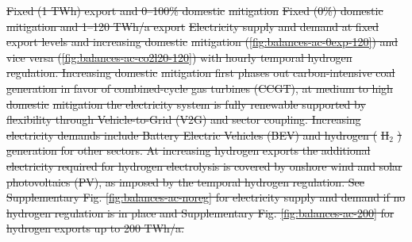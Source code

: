 \documentclass[5p,numafflabel]{elsarticle}
\newcommand{\co}{\ce{CO2}~}
\def\co{CO${}_2${\:}}
\providecommand{\DIFdeltex}[1]{{\protect\color{red}\sout{#1}}}                      %
\providecommand{\DIFdelFL}[1]{\DIFdel{#1}} %
\providecommand{\DIFdel}[1]{\texorpdfstring{\DIFdeltex{#1}}{}} %
\begin{document}
{%
\DIFdelFL{Fixed (1 TWh) export and 0--100\% domestic }%
\DIFdelFL{mitigation}}
{%
\DIFdelFL{Fixed (0\%) domestic }%
\DIFdelFL{mitigation and 1--120 TWh/a export}}
{%
\DIFdelFL{Electricity supply and demand at fixed export levels and increasing domestic }%
\DIFdelFL{mitigation (\ref{fig:balances-ac-0exp-120}) and vice versa (\ref{fig:balances-ac-co2l20-120}) with hourly temporal hydrogen regulation. Increasing domestic }%
\DIFdelFL{mitigation first phases out carbon-intensive coal generation in favor of combined-cycle gas turbines (CCGT), at medium to high domestic }%
\DIFdelFL{mitigation the electricity system is fully renewable supported by flexibility through Vehicle-to-Grid (V2G) and sector coupling. Increasing electricity demands include Battery Electric Vehicles (BEV) and hydrogen (}%
\DIFdelFL{H${}_2$}%
\DIFdelFL{) generation for other sectors.
    At increasing hydrogen exports the additional electricity required for hydrogen electrolysis is covered by onshore wind and solar photovoltaics (PV), as imposed by the temporal hydrogen regulation. 
    See Supplementary Fig. \ref{fig:balances-ac-noreg} for electricity supply and demand if no hydrogen regulation is in place and Supplementary Fig. \ref{fig:balances-ac-200} for hydrogen exports up to 200 TWh/a.
    }}
\end{document}
